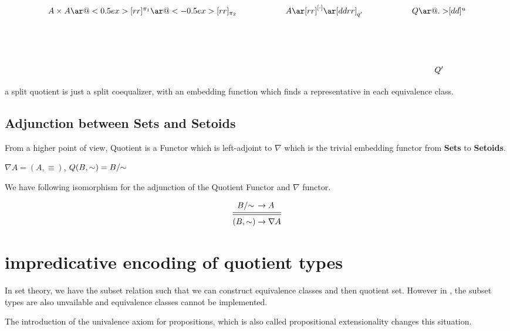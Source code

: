 \begin{displaymath}
    \xymatrix{A \times A \ar@<0.5ex>[rr]^{\pi_1} \ar@<-0.5ex>[rr]_{\pi_2} && A \ar[rr]^{[\cdot]}
      \ar[ddrr]_{q'} && Q
      \ar@{.>}[dd]^u \\ \\
& &&& Q' }
\end{displaymath}



a split quotient is just a split coequalizer, with an embedding
function which finds a representative in each equivalence class.


\subsection{Adjunction between {\textbf{Sets}} and \textbf{Setoids}}

From a higher point of view, Quotient is a Functor which is left-adjoint to $\nabla$ which is the trivial embedding functor from \textbf{Sets} to \textbf{Setoids}.

\begin{definition}

$\nabla A = (A , \equiv)$, $Q (B , \sim) = \qset{B}$

\end{definition}

We have following isomorphism for  the adjunction of the Quotient
Functor and $\nabla$ functor.

\begin{equation*}
\begin{aligned}
\qset{B} & \rightarrow A\\
\midrule
\midrule
(B , \sim) & \rightarrow \nabla A\\
\end{aligned}
\end{equation*}


\section{impredicative encoding of quotient types}

In set theory, we have the subset relation such that we can construct equivalence
classes and then quotient set. 
However in \itt, the subset types are also unvailable and equivalence
classes cannot be implemented.

The introduction of the univalence axiom for propositions, which is also
called propositional extensionality changes this situation.


